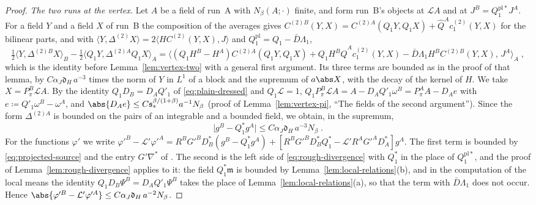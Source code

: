 \begin{proof}
\emph{The two runs at the vertex.} Let $A$ be a field of run~A with $N_\beta(A; \cdot)$ finite, and form run~B's objects at $\mathcal LA$ and at $J^B = Q^{\mathrm{pl}*}_1J^A$. For a field $Y$ and a field $X$ of run~B the composition of the averages gives $C^{(2)B}(Y, X) = C^{(2)A}(Q_1Y, Q_1X) + \hat Q^Ac^{(2)}_1(Y, X)$ for the bilinear parts, and with $\langle Y, \Delta^{(2)}X\rangle = 2\langle HC^{(2)}(Y, X), J\rangle$ and $Q^{\mathrm{pl}}_1 = Q_1 - \bar D\Lambda_1$,
\[
    \tfrac{1}{2}\langle Y, \Delta^{(2)B}X\rangle_B - \tfrac{1}{2}\langle Q_1Y, \Delta^{(2)A}Q_1X\rangle_A = \bigl\langle(Q_1H^B - H^A)C^{(2)A}(Q_1Y, Q_1X) + Q_1H^B\hat Q^Ac^{(2)}_1(Y, X) - \bar D\Lambda_1H^BC^{(2)B}(Y, X),\, J^A\bigr\rangle_A\;,
\]
which is the identity before Lemma~\ref{lem:vertex-two} with a general first argument. Its three terms are bounded as in the proof of that lemma, by $C\alpha_J\mathfrak d_H\,a^{-3}$ times the norm of $Y$ in $L^1$ of a block and the supremum of $a\abs X$, with the decay of the kernel of $H$. We take $X = P^B_\pi\mathcal LA$. By the identity $Q_1D_B = D_AQ'_1$ of \eqref{eq:plain-dressed} and $Q_1\mathcal L = 1$, $Q_1P^B_\pi\mathcal LA = A - D_AQ'_1\omega^B = P^A_\pi A - D_Ae$ with $e \coloneqq Q'_1\omega^B - \omega^A$, and $\abs{D_Ae} \leq C\mathfrak s_*^{\beta/(1+\beta)}a^{-1}N_\beta$ (proof of Lemma~\ref{lem:vertex-pi}, ``The fields of the second argument''). Since the form $\Delta^{(2)A}$ is bounded on the pairs of an integrable and a bounded field, we obtain, in the supremum,
\begin{equation}\label{eq:projected-source}
    \bigl\lvert g^B - Q_1^*g^A\bigr\rvert \leq C\alpha_J\mathfrak d_H\,a^{-3}N_\beta\;.
\end{equation}
For the functions $\varphi'$ we write $\varphi'^B - \mathcal L'\varphi'^A = R^BG'^BD_B^*(g^B - Q_1^*g^A) + [R^BG'^BD_B^*Q_1^* - \mathcal L'R^AG'^AD_A^*]g^A$. The first term is bounded by \eqref{eq:projected-source} and the entry $G'\nabla^*$ of \cite[(3.42)]{BalabanPBG}. The second is the left side of \eqref{eq:rough-divergence} with $Q_1^*$ in the place of $Q^{\mathrm{pl}*}_1$, and the proof of Lemma~\ref{lem:rough-divergence} applies to it: the field $Q_1^*\mathfrak m$ is bounded by Lemma~\ref{lem:local-relations}(b), and in the computation of the local means the identity $Q_1D_B\Psi^B = D_AQ'_1\Psi^B$ takes the place of Lemma~\ref{lem:local-relations}(a), so that the term with $\bar D\Lambda_1$ does not occur. Hence $\abs{\varphi'^B - \mathcal L'\varphi'^A} \leq C\alpha_J\mathfrak d_H\,a^{-2}N_\beta$.


\end{proof}
